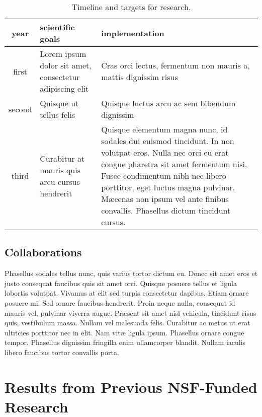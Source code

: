 \documentclass[12pt]{amsart}
\theoremstyle{definition}
\numberwithin{equation}{section}
\begin{document}
\begin{table}
\begin{center}
\caption{%
Timeline and targets for research.
}
\renewcommand{\arraystretch}{1.1}%
\tabcolsep
\begin{tabular}{|c|p{0.39\hsize}|p{0.39\hsize}|}
\hline
year &\hfil scientific goals\hfil&\hfil implementation\hfil\\
\hline
first &
Lorem ipsum dolor sit amet, consectetur adipiscing elit &
Cras orci lectus, fermentum non mauris a, mattis dignissim risus \\
\hline
second &
Quisque ut tellus felis &
Quisque luctus arcu ac sem bibendum dignissim \\
\hline
third &
Curabitur at mauris quis arcu cursus hendrerit &
Quisque elementum magna nunc, id sodales dui euismod tincidunt. In non volutpat eros. Nulla nec orci eu erat congue pharetra sit amet fermentum nisi. Fusce condimentum nibh nec libero porttitor, eget luctus magna pulvinar. M{\ae}cenas non ipsum vel ante finibus convallis. Phasellus dictum tincidunt cursus.\\
\hline
\end{tabular}
\end{center}
\end{table}


\subsection{Collaborations}
Phasellus sodales tellus nunc, quis varius tortor dictum eu. Donec sit amet eros et justo consequat faucibus quis sit amet orci. Quisque posuere tellus et ligula lobortis volutpat. Vivamus at elit sed turpis consectetur dapibus. Etiam ornare posuere mi. Sed ornare faucibus hendrerit. Proin neque nulla, consequat id mauris vel, pulvinar viverra augue. Pr{\ae}sent sit amet nisl vehicula, tincidunt risus quis, vestibulum massa. Nullam vel malesuada felis. Curabitur ac metus ut erat ultricies porttitor nec in elit. Nam vit{\ae} ligula ipsum. Phasellus ornare congue tempor. Phasellus dignissim fringilla enim ullamcorper blandit. Nullam iaculis libero faucibus tortor convallis porta. 


\section{Results from Previous NSF-Funded Research}%
\end{document}
